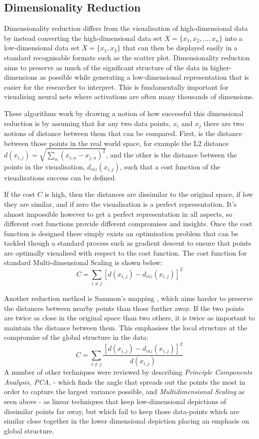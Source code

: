 \documentclass[a4paper,11pt,titlepage]{article}
\begin{document}
\subsection{Dimensionality Reduction}
	Dimensionality reduction differs from the visualisation of high-dimensional data by instead converting the high-dimensional data set  $ X = \{ x_{1}, x_{2},..., x_{n} \} $ into a low-dimensional data set $ X = \{ x_{1}, x_{2} \} $ that can then be displayed easily in a standard recognisable formats such as the scatter plot. Dimensionality reduction aims to preserve as much of the significant structure of the data in higher-dimensions as possible while generating a low-dimensional representation that is easier for the researcher to interpret. This is fundamentally important for visualising neural nets where activations are often many thousands of dimensions.
		\par 
		These algorithms work by drawing a notion of how successful this dimensional reduction is by assuming that for any two data points, $ x_{i} $ and $ x_{j} $ there are two notions of distance between them that can be compared. First, is the distance between those points in the real world space, for example the L2 distance $ d(x_{i,j}) = \sqrt{\sum\nolimits_{n} (x_{i,n} - x_{j,n})^2 } $, and the other is the  distance between the points in the visualisation, $ d_{viz}(x_{i,j}) $, such that a cost function of the visualisations success can be defined.
		\par  		
		If the cost $ C $ is high, then the distances are dissimilar to the original space, if low they are similar, and if zero the visualisation is a perfect representation. It's almost impossible however to get a perfect representation in all aspects, so different cost functions provide different compromises and insights. Once the cost function is designed there simply exists an optimisation problem that can be tackled though a standard process such as gradient descent to ensure that points are optimally visualised with respect to the cost function. The cost function for standard Multi-dimensional Scaling \cite{Torgerson1952} is shown below: 
		$$
			C = 
			\sum\limits_{i \neq j}
			[d(x_{i,j}) - d_{viz}(x_{i,j}) ]^2
		$$
		\par 
		Another reduction method is Sammon's mapping \cite{Sammon1969}, which aims harder to preserve the distances between nearby points than those further away. If the two points are twice as close in the original space than  two others, it is twice as important to maintain the distance between them. This emphasises the local structure at the compromise of the global structure in the data:
		$$
			C = 
			\sum\limits_{i \neq j}
			\frac{ [d(x_{i,j}) - d_{viz}(x_{i,j}) ]^2 }					{d(x_{i,j})}
		$$
		A number of other techniques were reviewed by \cite{VanderMaaten2009} describing \textit{Principle Components Analysis, PCA,} \cite{Hotelling33} - which finds the angle that spreads out the points the most in order to capture the largest variance possible, and \textit{Multidimensional Scaling} as seen above - as linear techniques that keep low-dimensional depictions of dissimilar points far away, but which fail to keep those data-points which are similar close together in the lower dimensional depiction placing an emphasis on global structure.
 		
\end{document}
